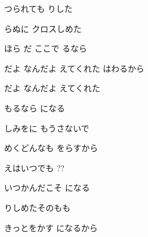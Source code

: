 \documentclass[14pt]{ltjsarticle}
\begin{document}
{  
つられても りした
  \jisho{}

  らぬに クロスしめた
  \jisho{}

  
ほら だ ここで るなら
  \jisho{}

\item
  だよ なんだよ えてくれた はわるから
  \jisho{}

\item
  だよ なんだよ えてくれた
  \jisho{}

  もるなら になる
  \jisho{}

  しみをに もうさないで
  \jisho{}

  めくどんなも をらすから
  \jisho{}

\item
  えはいつでも ??
  \jisho{}

  
いつかんだこそ になる
  \jisho{}

  りしめたそのもも
  \jisho{}

  
きっとをかす になるから        
}
\end{document}
